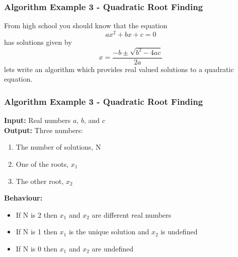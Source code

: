 \documentclass[14pt]{beamer}
\begin{document}
\begin{frame} %
\frametitle{Algorithm Example 3 - Quadratic Root Finding}
From high school you should know that the equation
\begin{equation}
a x^2 + b x + c = 0
\end{equation}
has solutions given by
\begin{equation}
x = \frac{-b \pm \sqrt{b^2 - 4 a c}}{2a}
\end{equation}
lets write an algorithm which provides real valued solutions to a quadratic equation.
\end{frame}

\begin{frame} %
\frametitle{Algorithm Example 3 - Quadratic Root Finding}
{\footnotesize
\textbf{Input:} Real numbers $a$, $b$, and $c$ \\
\textbf{Output:} Three numbers:
\begin{enumerate}
\item The number of solutions, N
\item One of the roots, $x_1$
\item The other root, $x_2$
\end{enumerate}
\textbf{Behaviour:}
\begin{itemize}
\item If N is 2 then $x_1$ and $x_2$ are different real numbers
\item If N is 1 then $x_1$ is the unique solution and $x_2$ is undefined
\item If N is 0 then $x_1$ and $x_2$ are undefined
\end{itemize} 
} 
\end{frame}
\end{document}
